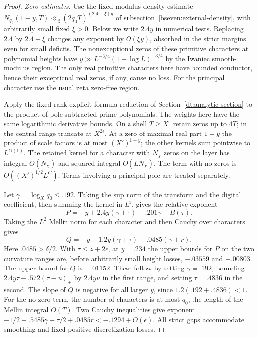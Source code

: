 \documentclass[11pt,a4paper]{article}
\theoremstyle{paperplain}
\numberwithin{equation}{section}
\begin{document}
\begin{proof}
\par\smallskip\noindent\textit{Zero estimates.}  Use the fixed-modulus density estimate
\(N_{q_0}(1-y,T)\ll_\xi (2q_0T)^{(2.4+\xi)y}\) of subsection~\ref{bseven:external-density}, with
arbitrarily small fixed \(\xi>0\). Below we write \(2.4y\) in numerical tests. Replacing \(2.4\)
by \(2.4+\xi\) changes any exponent by \(O(\xi y)\), absorbed in the strict margins even for small
deficits. The nonexceptional zeros of these primitive characters at polynomial heights have \(y\gg
L^{-3/4}(1+\log L)^{-3/4}\) by the Iwaniec smooth-modulus region. The only real primitive
characters here have bounded conductor, hence their exceptional real zeros, if any, cause no loss.
For the principal character use the usual zeta zero-free region.

Apply the fixed-rank explicit-formula reduction of
Section~\ref{dt:analytic-section} to the product of pole-subtracted
prime polynomials. The weights here have the same logarithmic derivative
bounds. On a shell $T\ge X^\epsilon$ retain zeros up to $4T$; in the
central range truncate at $X^{2\epsilon}$. At a zero of maximal real
part $1-y$ the product of scale factors is at most $(X')^{1-y}$;
the other kernels sum pointwise to $L^{O(1)}$. The retained kernel for
a character with $N_\chi$ zeros on the layer has integral $O(N_\chi)$
and squared integral $O(LN_\chi)$. The term with no zeros is
$O((X')^{1/2}L^C)$. Terms involving a principal pole are treated separately.

Let \(\gamma=\log_X q_0\le.192\). Taking the sup norm of the transform and the digital coefficient, then summing the kernel in \(L^1\), gives the relative exponent
\[
 P=-y+2.4y(\gamma+\tau)-.201\gamma-B(\tau).
\]
Taking the \(L^2\) Mellin norm for each character and then Cauchy over characters gives
\[
 Q=-y+1.2y(\gamma+\tau)+.0485(\gamma+r).
\]
Here \(.0485>\delta/2\). With \(\tau\le z+2\epsilon\), at \(y=.234\) the upper bounds for \(P\) on
the two curvature ranges are, before arbitrarily small height losses, \(-.03559\) and \(-.00803\).
The upper bound for \(Q\) is \(-.01152\). These follow by setting \(\gamma=.192\), bounding
\(2.4y\tau-.572(\tau-u)_+\) by \(2.4yu\) in the first range, and setting \(\tau=.4836\) in the
second. The slope of \(Q\) is negative for all larger \(y\), since \(1.2(.192+.4836)<1\). For the
no-zero term, the number of characters is at most \(q_0\), the length of the Mellin integral
\(O(T)\). Two Cauchy inequalities give exponent
\(-1/2+.5485\gamma+\tau/2+.0485r<-.1294+O(\epsilon)\). All strict gaps accommodate smoothing and
fixed positive discretization losses.


\end{proof}
\end{document}
